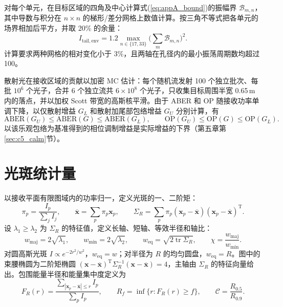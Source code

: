 对每个单元，在目标区域的四角及中心计算式(\ref{eq:appA_bound})的振幅界 $\mathcal B_{m,n}$，其中导数与积分在 $n\times n$ 的梯形/差分网格上数值计算。按三角不等式把各单元的场界相加后平方，并取 20\% 的余量：
\begin{equation}
I_{\mathrm{tail,env}}=1.2\max_{n\in\{17,33\}}\Big(\sum_m\mathcal B_{m,n}\Big)^2.
\label{eq:appA_env}
\end{equation}
计算要求两种网格的相对变化小于 3\%，且两轴在孔径内的最小振荡周期数均超过 100。

散射光在接收区域的贡献以加密 MC 估计：每个随机流发射 100 个独立批次、每批 $10^6$ 个光子，合并 6 个独立流共 $6\times10^8$ 个光子，只收集目标周围半宽 0.65\,m 内的落点，并以加权 Scott 带宽的高斯核平滑。由于 ABER 和 OP 随接收功率单调下降，以仅散射增益 $G_L$ 和散射加尾部包络增益 $G_U$ 分别计算，有
\begin{equation}
\mathrm{ABER}(G_U)\le\mathrm{ABER}(G)\le\mathrm{ABER}(G_L),\qquad
\mathrm{OP}(G_U)\le\mathrm{OP}(G)\le\mathrm{OP}(G_L).
\label{eq:appA_sandwich}
\end{equation}
以该乐观包络为基准得到的相位调制增益是实际增益的下界（第五章第\ref{sec:c5_calm}节）。

\section{光斑统计量}
\label{sec:c5_spot}

以接收平面有限图域内的功率归一，定义光斑的一、二阶矩：
\begin{equation}
\pi_p=\frac{I_p}{\sum_jI_j},\qquad
\overline{\mathbf x}=\sum_p\pi_p\mathbf x_p,\qquad
\Sigma_R=\sum_p\pi_p(\mathbf x_p-\overline{\mathbf x})(\mathbf x_p-\overline{\mathbf x})^{\mathrm T}.
\label{eq:c5_moments}
\end{equation}
设 $\lambda_1\ge\lambda_2$ 为 $\Sigma_R$ 的特征值，定义长轴、短轴、等效半径和轴比：
\begin{equation}
w_{\mathrm{maj}}=2\sqrt{\lambda_1},\qquad w_{\mathrm{min}}=2\sqrt{\lambda_2},\qquad
w_{\mathrm{eq}}=\sqrt{2\operatorname{tr}\Sigma_R},\qquad \chi=\frac{w_{\mathrm{maj}}}{w_{\mathrm{min}}}.
\label{eq:c5_widths}
\end{equation}
对圆高斯光斑 $I\propto e^{-2r^2/w^2}$，$w_{\mathrm{eq}}=w$；对半径为 $R$ 的均匀圆盘，$w_{\mathrm{eq}}=R$。图中的束腰椭圆为二阶矩椭圆 $(\mathbf x-\overline{\mathbf x})^{\mathrm T}\Sigma_R^{-1}(\mathbf x-\overline{\mathbf x})=4$，主轴由 $\Sigma_R$ 的特征向量给出。包围能量半径和能量集中度定义为
\begin{equation}
F_R(r)=\frac{\sum_{|\mathbf x_p-\overline{\mathbf x}|\le r}I_p}{\sum_pI_p},\qquad
R_f=\inf\{r:F_R(r)\ge f\},\qquad \mathcal C=\frac{R_{0.5}}{R_{0.9}}.
\label{eq:c5_encircled}
\end{equation}

